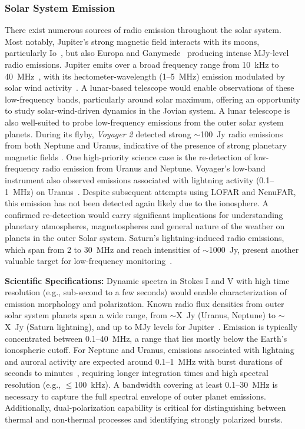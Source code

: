 \subsubsection{Solar System Emission} 
There exist numerous sources of radio emission throughout the solar system. Most notably, Jupiter's strong magnetic field interacts with its moons, particularly Io~\citep{Io}, but also Europa and Ganymede~\citep{Corentin} producing intense MJy-level radio emissions. Jupiter emits over a broad frequency range from 10~kHz to 40~MHz~\citep{zarka_auroral_1998}, with its hectometer-wavelength (1--5~MHz) emission modulated by solar wind activity~\citep{Desch1984}. A lunar-based telescope would enable observations of these low-frequency bands, particularly around solar maximum, offering an opportunity to study solar-wind-driven dynamics in the Jovian system. A lunar telescope is also well-suited to probe low-frequency emissions from the outer solar system planets. During its flyby, \textit{Voyager 2} detected strong $\sim$100~Jy radio emissions from both Neptune and Uranus, indicative of the presence of strong planetary magnetic fields \citep{zarka_auroral_1998, ZHANG199237}. One high-priority science case is the re-detection of low-frequency radio emission from Uranus and Neptune. Voyager's low-band instrument also observed emissions associated with lightning activity (0.1--1~MHz) on Uranus~\citep{1986Zarka_Emission}. Despite subsequent attempts using LOFAR and NenuFAR, this emission has not been detected again likely due to the ionosphere. A confirmed re-detection would carry significant implications for understanding planetary atmospheres, magnetospheres and general nature of the weather on planets in the outer Solar system. Saturn's lightning-induced radio emissions, which span from 2 to 30~MHz and reach intensities of $\sim$1000~Jy, present another valuable target for low-frequency monitoring~\citep{Zarka2004}.

\textbf{Scientific Specifications:} Dynamic spectra in Stokes I and V with high time resolution (e.g., sub-second to a few seconds) would enable characterization of emission morphology and polarization. Known radio flux densities from outer solar system planets span a wide range, from $\sim$X~Jy (Uranus, Neptune) to $\sim$X~Jy (Saturn lightning), and up to MJy levels for Jupiter~\citep{zarka_auroral_1998,ZHANG199237,Zarka2004}. Emission is typically concentrated between 0.1–40~MHz, a range that lies mostly below the Earth's ionospheric cutoff. For Neptune and Uranus, emissions associated with lightning and auroral activity are expected around 0.1–1~MHz with burst durations of seconds to minutes~\citep{1986Zarka_Emission}, requiring longer integration times and high spectral resolution (e.g., $\leq$100~kHz). A bandwidth covering at least 0.1–30~MHz is necessary to capture the full spectral envelope of outer planet emissions. Additionally, dual-polarization capability is critical for distinguishing between thermal and non-thermal processes and identifying strongly polarized bursts.



